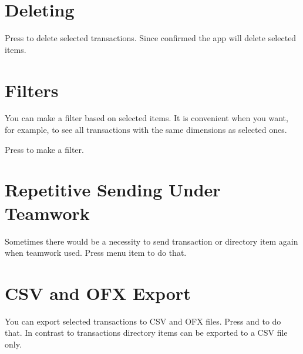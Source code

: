 \documentclass[a4paper,10pt,english]{sphinxmanual}
\begin{document}
\section{Deleting}
\label{\detokenize{bulk-actions:deleting}}
Press  to delete selected transactions. Since confirmed the app will delete
selected items.

\noindent{}
\noindent{}


\section{Filters}
\label{\detokenize{bulk-actions:filters}}
You can make a filter based on selected items. It is convenient when you want, for example,
to see all transactions with the same dimensions as selected ones.

Press  to make a filter.

\noindent{}
\noindent{}


\section{Repetitive Sending Under Teamwork}
\label{\detokenize{bulk-actions:repetitive-sending-under-teamwork}}
Sometimes there would be a necessity to send transaction or directory item again when teamwork used.
Press  menu item to do that.

\noindent{}
\noindent{}
\noindent{}


\section{CSV and OFX Export}
\label{\detokenize{bulk-actions:csv-and-ofx-export}}
You can export selected transactions to CSV and OFX files. Press 
and  to do that. In contrast to transactions directory items
can be exported to a CSV file only.
\end{document}
